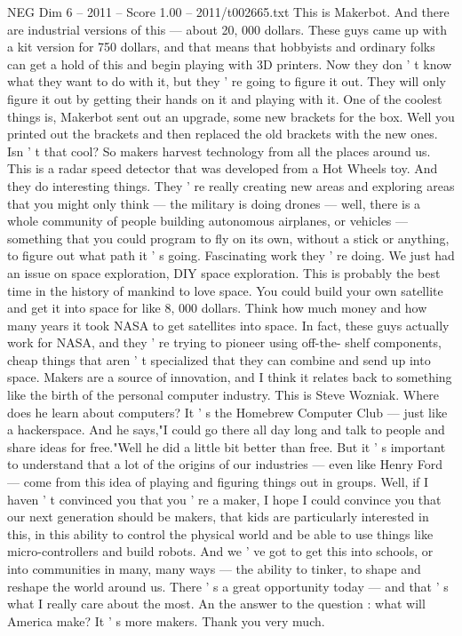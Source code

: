 \begin{textsample}{NEG Dim 6 – 2011 – Score 1.00 – 2011/t002665.txt}
This is Makerbot.
And there are industrial versions of this — about 20, 000 dollars.
These guys came up with a kit version for 750 dollars, and that means that hobbyists and ordinary folks can get a hold of this and begin playing with 3D printers.
Now they don ' t know what they want to do with it, but they ' re going to figure it out.
They will only figure it out by getting their hands on it and playing with it.
One of the coolest things is, Makerbot sent out an upgrade, some new brackets for the box.
Well you printed out the brackets and then replaced the old brackets with the new ones.
Isn ' t that cool?
So makers harvest technology from all the places around us.
This is a radar speed detector that was developed from a Hot Wheels toy.
And they do interesting things.
They ' re really creating new areas and exploring areas that you might only think — the military is doing drones — well, there is a whole community of people building autonomous airplanes, or vehicles — something that you could program to fly on its own, without a stick or anything, to figure out what path it ' s going.
Fascinating work they ' re doing.
We just had an issue on space exploration, DIY space exploration.
This is probably the best time in the history of mankind to love space.
You could build your own satellite and get it into space for like 8, 000 dollars.
Think how much money and how many years it took NASA to get satellites into space.
In fact, these guys actually work for NASA, and they ' re trying to pioneer using off-the- shelf components, cheap things that aren ' t specialized that they can combine and send up into space.
Makers are a source of innovation, and I think it relates back to something like the birth of the personal computer industry.
This is Steve Wozniak.
Where does he learn about computers?
It ' s the Homebrew Computer Club — just like a hackerspace.
And he says,"I could go there all day long and talk to people and share ideas for free."Well he did a little bit better than free.
But it ' s important to understand that a lot of the origins of our industries — even like Henry Ford — come from this idea of playing and figuring things out in groups.
Well, if I haven ' t convinced you that you ' re a maker, I hope I could convince you that our next generation should be makers, that kids are particularly interested in this, in this ability to control the physical world and be able to use things like micro-controllers and build robots.
And we ' ve got to get this into schools, or into communities in many, many ways — the ability to tinker, to shape and reshape the world around us.
There ' s a great opportunity today — and that ' s what I really care about the most.
An the answer to the question : what will America make?
It ' s more makers.
Thank you very much.

\end{textsample}
